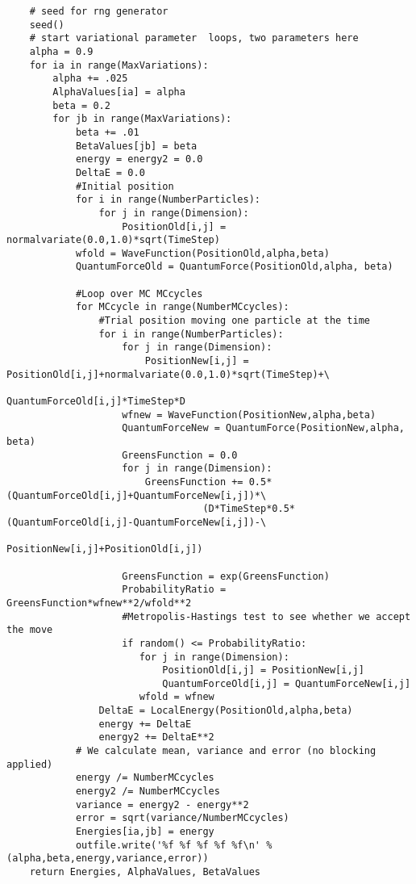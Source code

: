 \begin{verbatim}
    # seed for rng generator 
    seed()
    # start variational parameter  loops, two parameters here
    alpha = 0.9
    for ia in range(MaxVariations):
        alpha += .025
        AlphaValues[ia] = alpha
        beta = 0.2 
        for jb in range(MaxVariations):
            beta += .01
            BetaValues[jb] = beta
            energy = energy2 = 0.0
            DeltaE = 0.0
            #Initial position
            for i in range(NumberParticles):
                for j in range(Dimension):
                    PositionOld[i,j] = normalvariate(0.0,1.0)*sqrt(TimeStep)
            wfold = WaveFunction(PositionOld,alpha,beta)
            QuantumForceOld = QuantumForce(PositionOld,alpha, beta)

            #Loop over MC MCcycles
            for MCcycle in range(NumberMCcycles):
                #Trial position moving one particle at the time
                for i in range(NumberParticles):
                    for j in range(Dimension):
                        PositionNew[i,j] = PositionOld[i,j]+normalvariate(0.0,1.0)*sqrt(TimeStep)+\
                                           QuantumForceOld[i,j]*TimeStep*D
                    wfnew = WaveFunction(PositionNew,alpha,beta)
                    QuantumForceNew = QuantumForce(PositionNew,alpha, beta)
                    GreensFunction = 0.0
                    for j in range(Dimension):
                        GreensFunction += 0.5*(QuantumForceOld[i,j]+QuantumForceNew[i,j])*\
	                              (D*TimeStep*0.5*(QuantumForceOld[i,j]-QuantumForceNew[i,j])-\
                                      PositionNew[i,j]+PositionOld[i,j])
      
                    GreensFunction = exp(GreensFunction)
                    ProbabilityRatio = GreensFunction*wfnew**2/wfold**2
                    #Metropolis-Hastings test to see whether we accept the move
                    if random() <= ProbabilityRatio:
                       for j in range(Dimension):
                           PositionOld[i,j] = PositionNew[i,j]
                           QuantumForceOld[i,j] = QuantumForceNew[i,j]
                       wfold = wfnew
                DeltaE = LocalEnergy(PositionOld,alpha,beta)
                energy += DeltaE
                energy2 += DeltaE**2
            # We calculate mean, variance and error (no blocking applied)
            energy /= NumberMCcycles
            energy2 /= NumberMCcycles
            variance = energy2 - energy**2
            error = sqrt(variance/NumberMCcycles)
            Energies[ia,jb] = energy    
            outfile.write('%f %f %f %f %f\n' %(alpha,beta,energy,variance,error))
    return Energies, AlphaValues, BetaValues



\end{verbatim}
